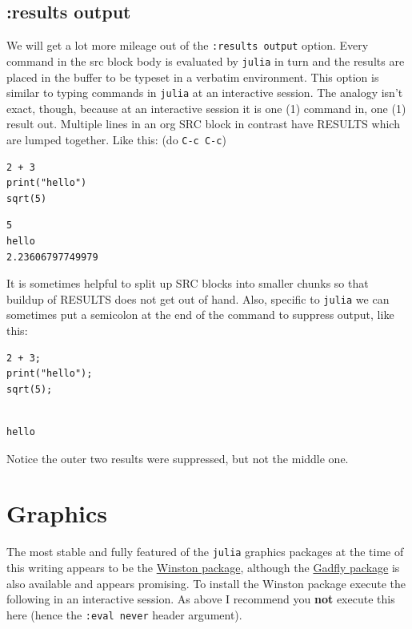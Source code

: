 \documentclass[11pt]{article}
\begin{document}
\subsection[:results output]{:results output}
\label{sec-2-2}

We will get a lot more mileage out of the \texttt{:results output} option. Every command in the src block body is evaluated by \texttt{julia} in turn and the results are placed in the buffer to be typeset in a verbatim environment.  This option is similar to typing commands in \texttt{julia} at an interactive session.  The analogy isn't exact, though, because at an interactive session it is one (1) command in, one (1) result out.  Multiple lines in an org SRC block in contrast have RESULTS which are lumped together.  Like this: (do \texttt{C-c C-c})

\begin{verbatim}
2 + 3
print("hello")
sqrt(5)
\end{verbatim}

\begin{verbatim}
5
hello
2.23606797749979
\end{verbatim}

It is sometimes helpful to split up SRC blocks into smaller chunks so that buildup of RESULTS does not get out of hand.  Also, specific to \texttt{julia} we can sometimes put a semicolon at the end of the command to suppress output, like this:

\begin{verbatim}
2 + 3;
print("hello");
sqrt(5);
\end{verbatim}

\begin{verbatim}

hello
\end{verbatim}

Notice the outer two results were suppressed, but not the middle one.
\section[Graphics]{Graphics}
\label{sec-3}

The most stable and fully featured of the \texttt{julia} graphics packages at
the time of this writing appears to be the \href{https://github.com/nolta/Winston.jl}{Winston package}, although
the \href{https://github.com/dcjones/Gadfly.jl}{Gadfly package} is also available and appears promising.  To
install the Winston package execute the following in an interactive
session.  As above I recommend you \textbf{not} execute this here (hence the
\texttt{:eval never} header argument).
\end{document}
